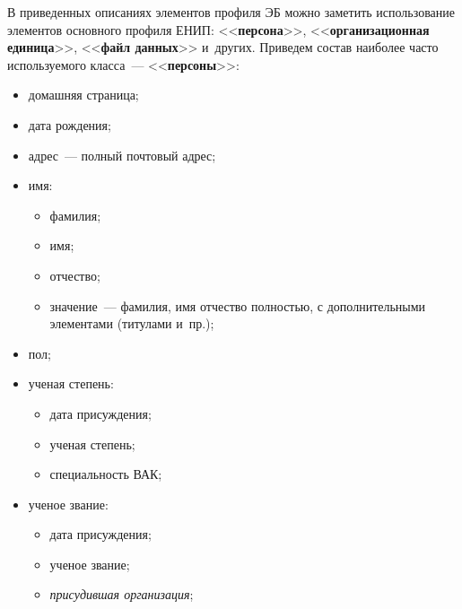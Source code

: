 \begin{multicols}{2}
  В приведенных описаниях элементов профиля ЭБ можно заметить использование 
элементов основного профиля ЕНИП: <<\textbf{персона}>>, <<\textbf{организационная 
единица}>>, <<\textbf{файл данных}>> и~других. Приведем состав наиболее часто 
используемого класса~--- <<\textbf{персоны}>>:
  \begin{itemize}
\item домашняя страница;\\[-14pt]
\item дата рождения;\\[-14pt]
\item адрес~--- полный почтовый адрес;\\[-14pt]
\item имя:\\[-14pt] 
\begin{itemize}
\item фамилия;\\[-14pt]
\item имя;\\[-14pt]
\item отчество;\\[-14pt]
\item значение~--- фамилия, имя отчество полностью, с дополнительными элементами (титулами и~пр.);\\[-14pt]
\end{itemize}
\item пол;\\[-14pt]
\item ученая степень:\\[-14pt]
\begin{itemize}
\item дата присуждения;\\[-14pt]
\item ученая степень;\\[-14pt]
\item специальность ВАК;\\[-14pt]
\end{itemize}
\item ученое звание:\\[-14pt]
\begin{itemize}
\item дата присуждения;\\[-14pt]
\item ученое звание;\\[-14pt]
\item \textit{присудившая организация};\\[-14pt]
\end{itemize}

\end{itemize}
\end{multicols}
